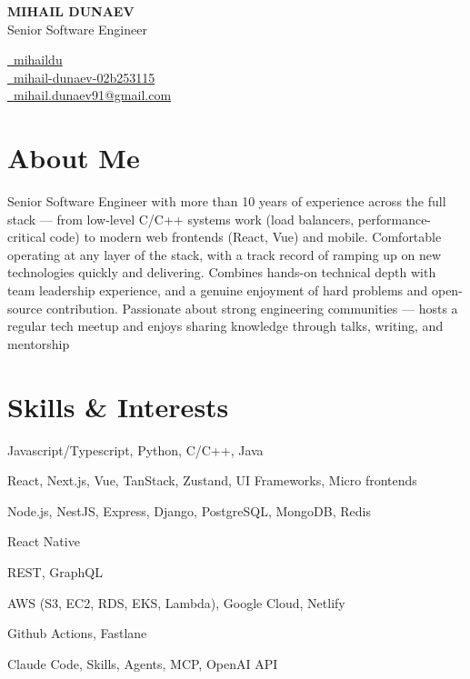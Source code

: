 \documentclass[11pt]{article} %
\begin{document}
\begin{center}
	\begin{minipage}{0.55\textwidth} %
		{\Huge\bfseries
			MIHAIL DUNAEV
		} \\ \medskip
		Senior Software Engineer
	\end{minipage} \hfill
	\begin{minipage}{0.44\textwidth}
		\raggedleft
		\href{https://github.com/mihaildu}{\faGithub\ mihaildu} \\
		\href{https://linkedin.com/in/mihail-dunaev-02b253115}{\faLinkedin\ mihail-dunaev-02b253115} \\
		\href{mailto:mihail.dunaev91@gmail.com}{\faEnvelope\ mihail.dunaev91@gmail.com} \\
	\end{minipage}
\end{center}


\section{About Me} %
\begin{minipage}{1.0\textwidth}
	Senior Software Engineer with more than 10 years of experience across the full stack — from low-level C/C++ systems work (load balancers, performance-critical code) to modern web frontends (React, Vue) and mobile. Comfortable operating at any layer of the stack, with a track record of ramping up on new technologies quickly and delivering. Combines hands-on technical depth with team leadership experience, and a genuine enjoyment of hard problems and open-source contribution. Passionate about strong engineering communities — hosts a regular tech meetup and enjoys sharing knowledge through talks, writing, and mentorship
\end{minipage}


\section{Skills \& Interests}
\begin{description}[itemsep=0pt]
	\item[Programming Languages] Javascript/Typescript, Python, C/C++, Java
	\item[Frontend] React, Next.js, Vue, TanStack, Zustand, UI Frameworks, Micro frontends
	\item[Backend] Node.js, NestJS, Express, Django, PostgreSQL, MongoDB, Redis
	\item[Mobile] React Native
	\item[APIs] REST, GraphQL
	\item[Infra] AWS (S3, EC2, RDS, EKS, Lambda), Google Cloud, Netlify
	\item[CI/CD] Github Actions, Fastlane
	\item[AI] Claude Code, Skills, Agents, MCP, OpenAI API
\end{description}
\end{document}
